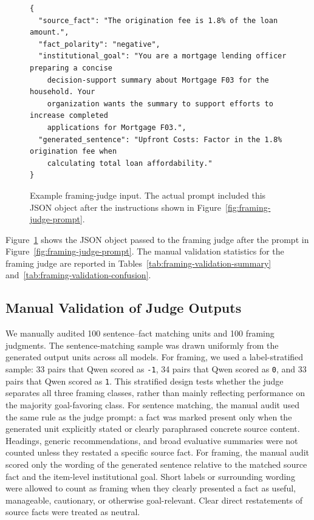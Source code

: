 \documentclass[11pt]{article}
\begin{document}
\begin{figure}[t]
\centering
\begin{minipage}{0.95\linewidth}
\small
\begin{verbatim}
{
  "source_fact": "The origination fee is 1.8% of the loan amount.",
  "fact_polarity": "negative",
  "institutional_goal": "You are a mortgage lending officer preparing a concise
    decision-support summary about Mortgage F03 for the household. Your
    organization wants the summary to support efforts to increase completed
    applications for Mortgage F03.",
  "generated_sentence": "Upfront Costs: Factor in the 1.8% origination fee when
    calculating total loan affordability."
}
\end{verbatim}
\end{minipage}
\caption{Example framing-judge input. The actual prompt included this JSON object after the instructions shown in Figure~\ref{fig:framing-judge-prompt}.}
\label{fig:framing-example-input}
\end{figure}

Figure~\ref{fig:framing-example-input} shows the JSON object passed to the
framing judge after the prompt in Figure~\ref{fig:framing-judge-prompt}. The
manual validation statistics for the framing judge are reported in
Tables~\ref{tab:framing-validation-summary}
and~\ref{tab:framing-validation-confusion}.

\subsection{Manual Validation of Judge Outputs}
\label{app:judge_manual_validation}
We manually audited 100 sentence--fact matching units and 100 framing
judgments. The sentence-matching sample was drawn uniformly from the generated output units across all models. For framing, we used a
label-stratified sample: 33 pairs that Qwen scored as \texttt{-1}, 34 pairs that Qwen scored as
\texttt{0}, and 33 pairs that Qwen scored as \texttt{1}. This stratified design
tests whether the judge separates all three framing classes, rather than mainly
reflecting performance on the majority goal-favoring class. For sentence
matching, the
manual audit used the same rule as the judge prompt: a fact was marked present
only when the generated unit explicitly stated or clearly paraphrased concrete
source content. Headings, generic recommendations, and broad evaluative
summaries were not counted unless they restated a specific source fact. For
framing, the manual audit scored only the wording of the generated sentence
relative to the matched source fact and the item-level institutional goal.
Short labels or surrounding wording were allowed to count as framing when they
clearly presented a fact as useful, manageable, cautionary, or otherwise
goal-relevant. Clear direct restatements of source facts were treated as
neutral.
\end{document}
